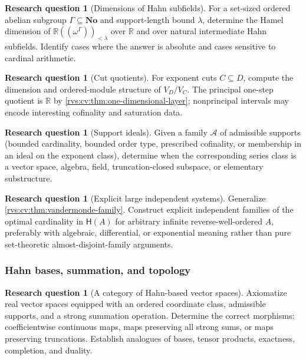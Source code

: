 \documentclass[11pt,letterpaper]{article}
\numberwithin{equation}{section}
\theoremstyle{definition}
\newtheorem{question}[theorem]{Research question}
\theoremstyle{remark}
\newcommand{\No}{\mathbf{No}}
\newcommand{\R}{\mathbb{R}}
\newcommand{\Hahn}{\mathsf{H}}
\begin{document}
\begin{question}[Dimensions of Hahn subfields]
For a set-sized ordered abelian subgroup $\Gamma\subseteq\No$ and support-length
bound $\lambda$, determine the Hamel dimension of
$\R((\omega^\Gamma))_{<\lambda}$ over $\R$ and over natural intermediate Hahn
subfields. Identify cases where the answer is absolute and cases sensitive to
cardinal arithmetic.
\end{question}

\begin{question}[Cut quotients]
For exponent cuts $C\subseteq D$, compute the dimension and ordered-module
structure of $V_D/V_C$. The principal one-step quotient is $\R$ by
\cref{rvs:cv:thm:one-dimensional-layer}; nonprincipal intervals may encode interesting
cofinality and saturation data.
\end{question}

\begin{question}[Support ideals]
Given a family $\mathcal A$ of admissible supports (bounded cardinality, bounded
order type, prescribed cofinality, or membership in an ideal on the exponent
class), determine when the corresponding series class is a vector space, algebra,
field, truncation-closed subspace, or elementary substructure.
\end{question}

\begin{question}[Explicit large independent systems]
Generalize \cref{rvs:cv:thm:vandermonde-family}. Construct explicit independent families
of the optimal cardinality in $\Hahn(A)$ for arbitrary infinite reverse-well-ordered
$A$, preferably with algebraic, differential, or exponential meaning rather than
pure set-theoretic almost-disjoint-family arguments.
\end{question}

\subsubsection{Hahn bases, summation, and topology}

\begin{question}[A category of Hahn-based vector spaces]
Axiomatize real vector spaces equipped with an ordered coordinate class, admissible
supports, and a strong summation operation. Determine the correct morphisms:
coefficientwise continuous maps, maps preserving all strong sums, or maps preserving
truncations. Establish analogues of bases, tensor products, exactness, completion,
and duality.
\end{question}
\end{document}
